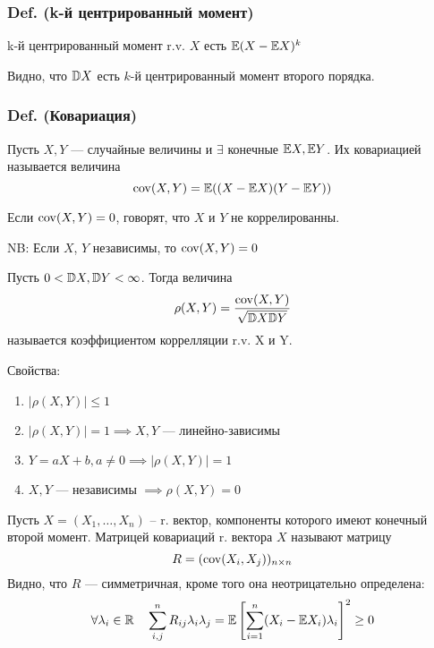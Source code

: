 \subsubsection{\texorpdfstring{Def. (k-й \textbf{центрированный}
момент)}{Def. (k-й центрированный момент)}}\label{def.-k-ux439-ux446ux435ux43dux442ux440ux438ux440ux43eux432ux430ux43dux43dux44bux439-ux43cux43eux43cux435ux43dux442}

k-й центрированный момент r.v. \(X\) есть \(\mathbb E (X - \mathbb E X)^k\)

Видно, что \(\mathbb D X\) есть \(k\)-й центрированный момент второго порядка.

\subsubsection{Def.
(Ковариация)}\label{def.-ux43aux43eux432ux430ux440ux438ux430ux446ux438ux44f}

Пусть \(X, Y\) --- случайные величины и \(\exists\) конечные
\(\mathbb E X, \mathbb E Y\). Их ковариацией называется величина
\[ \mathrm{cov}(X, Y) = \mathbb E( (X - \mathbb E X)(Y - \mathbb E Y) ) \]

Если \(\mathrm{cov}(X,Y) = 0\), говорят, что \(X\) и \(Y\) не коррелированны.

NB: Если \(X\), \(Y\) независимы, то \(\mathrm{cov}(X,Y)=0\)

Пусть \(0 < \mathbb D X, \mathbb D Y < \infty\). Тогда величина
\[ \rho(X,Y) = \frac{\mathrm{cov}(X,Y)}{\sqrt{\mathbb D X \mathbb D Y}} \] называется
коэффициентом коррелляции r.v. X и Y.

Свойства:

\begin{enumerate}
\def\labelenumi{\arabic{enumi}.}

\item
  \(|\rho(X,Y)| \leq 1\)
\item
  \(|\rho(X,Y)| = 1 \implies X,Y\) --- линейно-зависимы
\item
  \(Y=aX+b, a\neq 0 \implies |\rho(X,Y)|=1\)
\item
  \(X,Y\) --- независимы \(\implies \rho(X,Y)=0\)
\end{enumerate}

Пусть \(X = (X_1, \ldots, X_n)\) -- r. вектор, компоненты которого имеют
конечный второй момент. Матрицей ковариаций r. вектора \(X\) называют
матрицу \[ R = (\mathrm{cov}(X_i, X_j))_{n\times n} \] Видно, что \(R\) ---
симметричная, кроме того она неотрицательно определена:
\[\forall \lambda_i\in\mathbb R\quad \sum_{i,j}^n R_{ij} \lambda_i \lambda_j = \mathbb E \left[{\sum_{i=1}^n (X_i - \mathbb E X_i)\lambda_i}\right]^2 \geq 0\]

